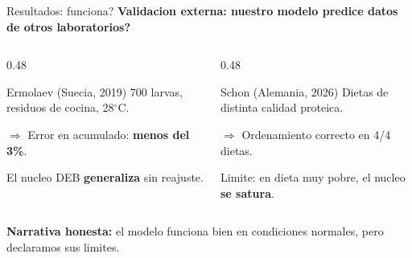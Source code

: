 \documentclass[aspectratio=169,11pt]{beamer}
\begin{document}
\begin{frame}{Resultados: funciona?}
  \centering
  \textbf{Validacion externa: nuestro modelo predice datos de otros laboratorios?}
  \vspace{0.4cm}
  \begin{columns}
    \begin{column}{0.48\textwidth}
      \begin{block}{Ermolaev (Suecia, 2019)}
        700 larvas, residuos de cocina, 28$^\circ$C.
        \vspace{0.2cm}
        
        $\Rightarrow$ Error en acumulado: \textbf{menos del 3\%}.
        \vspace{0.1cm}
        
        El nucleo DEB \textbf{generaliza} sin reajuste.
      \end{block}
    \end{column}
    \begin{column}{0.48\textwidth}
      \begin{block}{Schon (Alemania, 2026)}
        Dietas de distinta calidad proteica.
        \vspace{0.2cm}
        
        $\Rightarrow$ Ordenamiento correcto en 4/4 dietas.
        \vspace{0.1cm}
        
        Limite: en dieta muy pobre, el nucleo \textbf{se satura}.
      \end{block}
    \end{column}
  \end{columns}
  \vspace{0.4cm}
  \textcolor{verdehoja}{\textbf{Narrativa honesta:}} el modelo funciona bien en condiciones normales, pero declaramos sus limites.
\end{frame}
\end{document}
